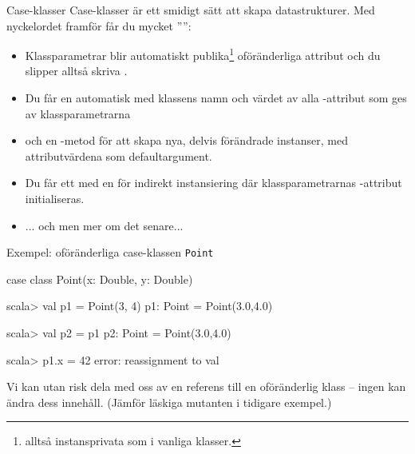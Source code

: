 \begin{Slide}{Case-klasser}\SlideFontSmall
Case-klasser är ett smidigt sätt att skapa  datastrukturer. Med nyckelordet  framför  får du mycket '''':

\begin{itemize}\SlideFontSmall
\item Klassparametrar blir automatiskt publika\footnote{alltså  instansprivata som i vanliga klasser.} oföränderliga attribut och du slipper alltså skriva .
\item Du får en automatisk  med klassens namn och värdet av alla -attribut som ges av klassparametrarna 
\item och en -metod för att skapa nya, delvis förändrade instanser, med attributvärdena som defaultargument.
\item Du får ett   med en   för indirekt instansiering där  klassparametrarnas -attribut initialiseras.
\pause
\item ... och  men mer om det senare...
\end{itemize}
\end{Slide}




\begin{Slide}{Exempel: oföränderliga case-klassen \texttt{Point}}

\begin{Code}[basicstyle=\SlideFontSize{10}{12}\ttfamily]
case class Point(x: Double, y: Double)
\end{Code}

\begin{REPLnonum}
scala> val p1 = Point(3, 4)
p1: Point = Point(3.0,4.0)

scala> val p2 = p1
p2: Point = Point(3.0,4.0)

scala> p1.x = 42
error: reassignment to val
\end{REPLnonum}
Vi kan utan risk dela med oss av en referens till en oföränderlig klass -- ingen kan ändra dess innehåll. (Jämför läskiga mutanten i tidigare exempel.)

\end{Slide}









